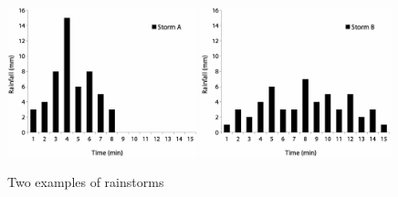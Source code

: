\begin{figure}[htbp]
  \centering
    \includegraphics[width=0.49\textwidth]{./img/example_storm_a}
    \includegraphics[width=0.49\textwidth]{./img/example_storm_b}
  \caption{Two examples of rainstorms}
  \label{fig:TwoExamplesofRainstorm}
\end{figure}

